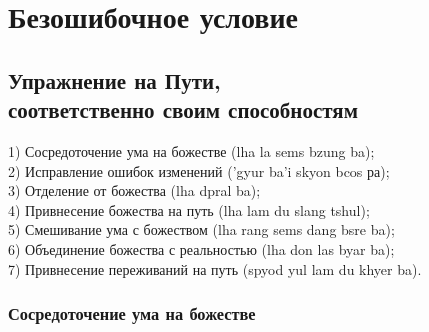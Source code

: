 
\section{Безошибочное условие}

\subsection{Упражнение на Пути, \\ соответственно своим способностям}

1) Сосредоточение ума на божестве (lha la sems bzung ba);\\
2) Исправление ошибок изменений ('gyur ba'i skyon bcos ра);\\
3) Отделение от божества (lha dpral ba);\\
4) Привнесение божества на путь (lha lam du slang tshul);\\
5) Смешивание ума с божеством (lha rang sems dang bsre ba);\\
6) Объединение божества с реальностью (lha don las byar ba);\\
7) Привнесение переживаний на путь (spyod yul lam du khyer ba).\\

\subsubsection{Сосредоточение ума на божестве}

